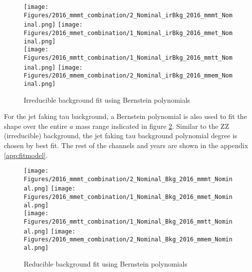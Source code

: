 \begin{figure}[ht!b]
  \centering
  \texttt{[image: Figures/2016\_mmmt\_combination/2\_Nominal\_irBkg\_2016\_mmmt\_Nominal.png]}
  \texttt{[image: Figures/2016\_mmet\_combination/1\_Nominal\_irBkg\_2016\_mmet\_Nominal.png]}\\
  \texttt{[image: Figures/2016\_mmtt\_combination/1\_Nominal\_irBkg\_2016\_mmtt\_Nominal.png]}
  \texttt{[image: Figures/2016\_mmem\_combination/2\_Nominal\_irBkg\_2016\_mmem\_Nominal.png]}\\
    \caption{\label{fig:fit_ZZ} Irreducible background fit using Bernstein polynomials}
\end{figure}

For the jet faking tau background, a Bernstein polynomial is also used to fit the shape over the entire $a$ mass range indicated in figure \ref{fig:fit_FF}. Similar to the ZZ (irreducible) background, the jet faking tau background polynomial degree is chosen by best fit. The rest of the channels and years are shown in the appendix \ref{app:fitmodel}. 



\begin{figure}[ht!b]
  \centering
  \texttt{[image: Figures/2016\_mmmt\_combination/2\_Nominal\_Bkg\_2016\_mmmt\_Nominal.png]}
  \texttt{[image: Figures/2016\_mmet\_combination/1\_Nominal\_Bkg\_2016\_mmet\_Nominal.png]}\\
  \texttt{[image: Figures/2016\_mmtt\_combination/1\_Nominal\_Bkg\_2016\_mmtt\_Nominal.png]}
  \texttt{[image: Figures/2016\_mmem\_combination/2\_Nominal\_Bkg\_2016\_mmem\_Nominal.png]}\\
    \caption{\label{fig:fit_FF} Reducible background fit using Bernstein polynomials}
\end{figure}


